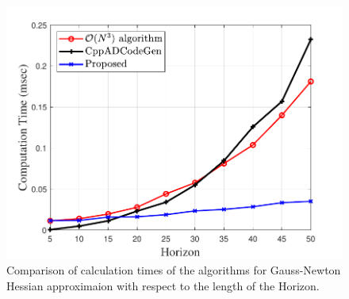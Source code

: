 \begin{figure}
	\centering
	\includegraphics[width=0.8\columnwidth]{Figures/O2O3.pdf}
	\caption{Comparison of calculation times of the algorithms for Gauss-Newton Hessian approximaion with respect to the length of the Horizon.}
	\label{fig:H_O2O3}
\end{figure}


	
	
		
		
		
		
		
		


	
	
		
